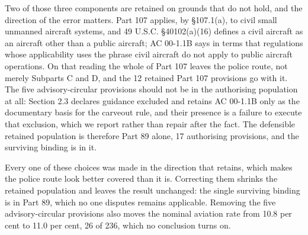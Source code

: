 Two of those three components are retained on grounds that do not hold, and the direction of the error matters. Part 107 applies, by \S{}107.1(a), to civil small unmanned aircraft systems, and 49 U.S.C. \S{}40102(a)(16) defines a civil aircraft as an aircraft other than a public aircraft; AC 00-1.1B says in terms that regulations whose applicability uses the phrase civil aircraft do not apply to public aircraft operations. On that reading the whole of Part 107 leaves the police route, not merely Subparts C and D, and the 12 retained Part 107 provisions go with it. The five advisory-circular provisions should not be in the authorising population at all: Section 2.3 declares guidance excluded and retains AC 00-1.1B only as the documentary basis for the carveout rule, and their presence is a failure to execute that exclusion, which we report rather than repair after the fact. The defensible retained population is therefore Part 89 alone, 17 authorising provisions, and the surviving binding is in it.

Every one of these choices was made in the direction that retains, which makes the police route look better covered than it is. Correcting them shrinks the retained population and leaves the result unchanged: the single surviving binding is in Part 89, which no one disputes remains applicable. Removing the five advisory-circular provisions also moves the nominal aviation rate from 10.8 per cent to 11.0 per cent, 26 of 236, which no conclusion turns on.

